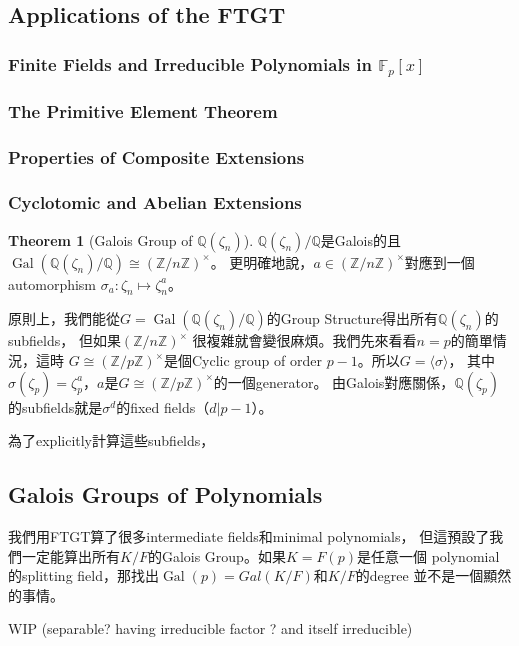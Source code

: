 \documentclass[12pt]{article}
\theoremstyle{definition}
\newtheorem{thm}{Theorem}
\newcommand{\FF}{\mathbb F}
\newcommand{\QQ}{\mathbb Q}
\newcommand{\ZZ}{\mathbb Z}
\DeclareMathOperator{\Gal}{Gal}
\begin{document}
\subsection{Applications of the FTGT}

\subsubsection{Finite Fields and Irreducible Polynomials in $\FF_p[x]$}
\subsubsection{The Primitive Element Theorem}
\subsubsection{Properties of Composite Extensions}

\subsubsection{Cyclotomic and Abelian Extensions}

\begin{thm}[Galois Group of $\QQ(\zeta_n)$]
	$\QQ(\zeta_n)/\QQ$是Galois的且$\Gal(\QQ(\zeta_n)/\QQ)\cong (\ZZ/n\ZZ)^\times$。
	更明確地說，$a\in (\ZZ/n\ZZ)^\times $對應到一個automorphism $\sigma_a: \zeta_n\mapsto \zeta_n^a$。
\end{thm}

原則上，我們能從$G=\Gal(\QQ(\zeta_n)/\QQ)$的Group Structure得出所有$\QQ(\zeta_n)$的subfields，
但如果$(\ZZ/n\ZZ)^\times$ 很複雜就會變很麻煩。我們先來看看$n=p$的簡單情況，這時
$G\cong (\ZZ/p\ZZ)^\times$是個Cyclic group of order $p-1$。所以$G=\langle \sigma \rangle$，
其中$\sigma(\zeta_p)=\zeta_p^a$，$a$是$G\cong (\ZZ/p\ZZ)^\times$的一個generator。
由Galois對應關係，$\QQ(\zeta_p)$的subfields就是$\sigma^d$的fixed fields（$d|p-1$）。

為了explicitly計算這些subfields，


\subsection{Galois Groups of Polynomials}

我們用FTGT算了很多intermediate fields和minimal polynomials，
但這預設了我們一定能算出所有$K/F$的Galois Group。如果$K=F(p)$是任意一個
polynomial的splitting field，那找出$\Gal(p)=Gal(K/F)$和$K/F$的degree
並不是一個顯然的事情。

WIP (separable? having irreducible factor ? and itself irreducible)
\end{document}

